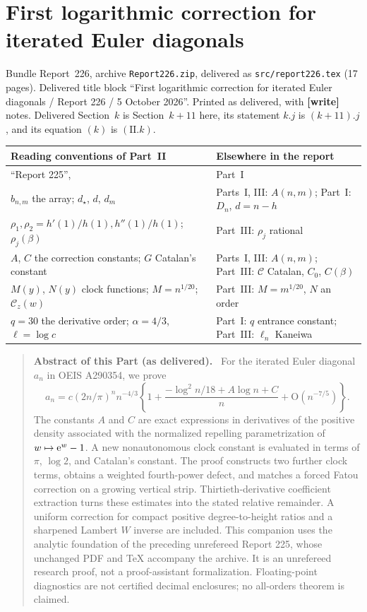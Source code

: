 \documentclass[11pt,letterpaper]{article}
\theoremstyle{remark}\newtheorem{remark}[theorem]{Remark}
\newcommand{\Oh}{\mathrm O}\newcommand{\supp}{\operatorname{supp}}
\newcommand{\file}[1]{\nolinkurl{#1}}
\newenvironment{partabstract}{\begin{quote}\small\noindent\textbf{Abstract of this Part (as delivered).}\ }{\end{quote}}
\newcommand{\partsource}[1]{\par\noindent\begin{minipage}{\textwidth}\small #1\end{minipage}\par\medskip}
\newcommand{\parteqs}[1]{\setcounter{equation}{0}%
 \renewcommand{\theequation}{#1\arabic{equation}}%
 \renewcommand{\theHequation}{#1\arabic{equation}}}
\begin{document}
\clearpage
\part{First logarithmic correction for iterated Euler diagonals}\label{ied:corr:part}
\parteqs{II.}
\partsource{Bundle Report~226, archive \file{Report226.zip}, delivered as \file{src/report226.tex} (17 pages). Delivered title block ``First logarithmic correction for iterated Euler diagonals / Report 226 / 5 October 2026''. Printed as delivered, with \textbf{[write]} notes. Delivered Section~$k$ is Section~$k+11$ here, its statement $k.j$ is $(k+11).j$, and its equation $(k)$ is $(\mathrm{II}.k)$.}
\begin{center}
\small
\begin{tabular}{@{}>{\raggedright\arraybackslash}p{} >{\raggedright\arraybackslash}p{}@{}}
\toprule
Reading conventions of Part~II & Elsewhere in the report\\
\midrule
``Report 225'', \cite{R225} & Part~I\\
$b_{n,m}$ the array; $d_\star$, $d$, $d_m$ & Parts~I, III: $A(n,m)$; Part~I: $D_n$, $d=n-h$\\
$\rho_1,\rho_2=h'(1)/h(1),h''(1)/h(1)$; $\rho_j(\beta)$ & Part~III: $\rho_j$ rational\\
$A$, $C$ the correction constants; $G$ Catalan's constant & Parts~I, III: $A(n,m)$; Part~III: $\mathcal C$ Catalan, $C_0$, $C(\beta)$\\
$M(y)$, $N(y)$ clock functions; $M=n^{1/20}$; $\mathcal C_z(w)$ & Part~III: $M=m^{1/20}$, $N$ an order\\
$q=30$ the derivative order; $\alpha=4/3$, $\ell=\log c$ & Part~I: $q$ entrance constant; Part~III: $\ell_n$ Kaneiwa\\
\bottomrule
\end{tabular}
\end{center}
\begin{partabstract}
For the iterated Euler diagonal $a_n$ in OEIS A290354, we prove
\[
 a_n=c(2n/\pi)^n n^{-4/3}
 \left\{1+\frac{-\log^2 n/18+A\log n+C}{n}
                  +\Oh(n^{-7/5})\right\}.
\]
The constants $A$ and $C$ are exact expressions in derivatives of the positive density associated with the normalized repelling parametrization of $w\mapsto\mathrm e^w-1$. A new nonautonomous clock constant is evaluated in terms of $\pi$, $\log2$, and Catalan's constant. The proof constructs two further clock terms, obtains a weighted fourth-power defect, and matches a forced Fatou correction on a growing vertical strip. Thirtieth-derivative coefficient extraction turns these estimates into the stated relative remainder. A uniform correction for compact positive degree-to-height ratios and a sharpened Lambert $W$ inverse are included. This companion uses the analytic foundation of the preceding unrefereed Report 225, whose unchanged PDF and TeX accompany the archive. It is an unrefereed research proof, not a proof-assistant formalization. Floating-point diagnostics are not certified decimal enclosures; no all-orders theorem is claimed.
\end{partabstract}
\end{document}
